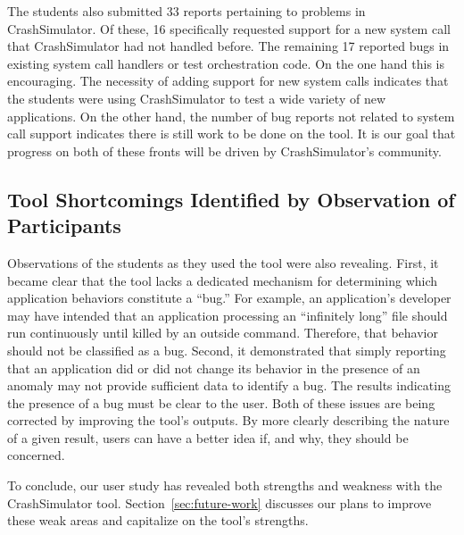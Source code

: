 The students also submitted 33 reports pertaining to problems in CrashSimulator.
Of these, 16 specifically requested support for a new system call that
CrashSimulator had not handled before.  The remaining 17 reported bugs in
existing system call handlers or test orchestration code.
On the one hand this is encouraging.  The necessity of adding
support for new system calls
indicates that the students were
using CrashSimulator to test a wide variety of new applications.
On the other hand, the number of bug reports not related to system call support
indicates there is still work to be done on the tool.
It is our goal that progress on both of these fronts will be driven by
CrashSimulator's community.

\subsection{Tool Shortcomings Identified by Observation of Participants}
\label{subsec:tool-shortcomings}
Observations of the students as they used the tool were also revealing.
First,
it became clear that the tool
lacks a dedicated mechanism
for determining
which application behaviors constitute a ``bug.''
For example, an application's developer
may have intended that an application processing an ``infinitely long'' file should run continuously
until killed by an outside command.
Therefore, that behavior should not be classified as a bug.
Second,
it demonstrated that
simply reporting that an application did or did not change its behavior
in the presence of an anomaly may not provide sufficient data to identify a bug. The results indicating the presence of a bug must be clear to the user.
Both of these issues are being corrected
by improving the tool's outputs.
By more clearly describing
the nature of a given result,
users can have a better idea
if,
and why,
they should be concerned.

To conclude, our user study has revealed both strengths and weakness
with the CrashSimulator tool.  Section~\ref{sec:future-work}
discusses our plans to improve
these weak areas and capitalize on the tool's strengths.
